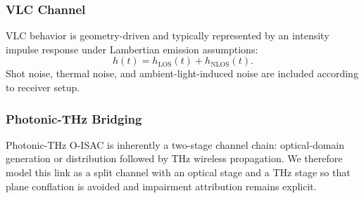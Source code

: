 \subsubsection{VLC Channel}
VLC behavior is geometry-driven and typically represented by an intensity impulse response under Lambertian emission assumptions:
\begin{equation}
h(t)=h_{\text{LOS}}(t)+h_{\text{NLOS}}(t).
\end{equation}
Shot noise, thermal noise, and ambient-light-induced noise are included according to receiver setup.

\subsubsection{Photonic-THz Bridging}
Photonic-THz O-ISAC is inherently a two-stage channel chain: optical-domain generation or distribution followed by THz wireless propagation. We therefore model this link as a split channel with an optical stage and a THz stage so that plane conflation is avoided and impairment attribution remains explicit.

